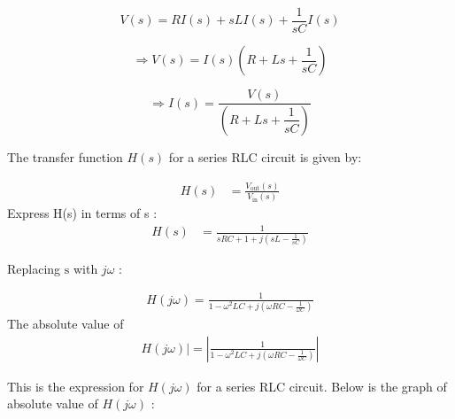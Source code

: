
\begin{equation}
	V(s) = R I(s) + sL I(s) + \dfrac{1}{sC} I(s)
\end{equation}

\begin{equation}
	\Rightarrow V(s) = I(s)\left(R + Ls + \dfrac{1}{sC}\right)
\end{equation}

\begin{equation}
	\Rightarrow I(s) = \dfrac{V(s)}{\left(R + Ls + \dfrac{1}{sC}\right)} \label{eq: 4}
\end{equation}

The transfer function \(H(s)\) for a series RLC circuit is given by:

\begin{align}
	H(s) &= \frac{V_{\text{out}}(s)}{V_{\text{in}}(s)} 
\end{align}
Express H(s) in terms of s :
\begin{align}
	H(s) &= \frac{1}{sRC + 1 + j(sL - \frac{1}{sC})}
\end{align}

Replacing $\text{s}$ with $j\omega$ :

\begin{align}
	H(j\omega) = \frac{1}{1 - \omega^2 LC + j(\omega RC - \frac{1}{\omega C})}
\end{align}
The absolute value of 
\begin{align}
	H(j\omega)| = \left| \frac{1}{1 - \omega^2 LC + j(\omega RC - \frac{1}{\omega C})} \right|
\end{align}

This is the expression for \(H(j\omega)\) for a series RLC circuit. Below is the graph of absolute value of $H(j\omega)$ :

